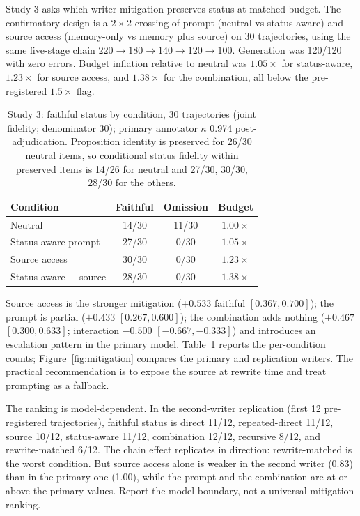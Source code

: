 \documentclass[11pt]{article}
\begin{document}
Study 3 asks which writer mitigation preserves status at matched budget. The
confirmatory design is a $2\times2$ crossing of prompt (neutral vs status-aware)
and source access (memory-only vs memory plus source) on 30 trajectories, using
the same five-stage chain $220 \to 180 \to 140 \to 120 \to 100$. Generation was
120/120 with zero errors. Budget inflation relative to neutral was $1.05\times$
for status-aware, $1.23\times$ for source access, and $1.38\times$ for the
combination, all below the pre-registered $1.5\times$ flag.

\begin{table}[t]
\centering
\small
\setlength{\tabcolsep}{3pt}
\begin{tabular}{lccc}
\toprule
Condition & Faithful & Omission & Budget \\
\midrule
Neutral & 14/30 & 11/30 & $1.00\times$ \\
Status-aware prompt & 27/30 & 0/30 & $1.05\times$ \\
Source access & 30/30 & 0/30 & $1.23\times$ \\
Status-aware + source & 28/30 & 0/30 & $1.38\times$ \\
\bottomrule
\end{tabular}
\caption{Study 3: faithful status by condition, 30 trajectories (joint fidelity;
denominator 30); primary annotator $\kappa$ 0.974 post-adjudication.
Proposition identity is preserved for 26/30 neutral items, so conditional
status fidelity within preserved items is 14/26 for neutral and 27/30, 30/30,
28/30 for the others.}
\label{tab:mitigation}
\end{table}

Source access is the stronger mitigation ($+0.533$ faithful $[0.367, 0.700]$);
the prompt is partial ($+0.433$ $[0.267, 0.600]$); the combination adds nothing
($+0.467$ $[0.300, 0.633]$; interaction $-0.500$ $[-0.667, -0.333]$) and
introduces an escalation pattern in the primary model. Table~\ref{tab:mitigation}
reports the per-condition counts; Figure~\ref{fig:mitigation} compares the
primary and replication writers. The practical recommendation is to expose the
source at rewrite time and treat prompting as a fallback.

The ranking is model-dependent. In the second-writer replication (first 12
pre-registered trajectories), faithful status is direct 11/12, repeated-direct
11/12, source 10/12, status-aware 11/12, combination 12/12, recursive 8/12, and
rewrite-matched 6/12. The chain effect replicates in direction: rewrite-matched
is the worst condition. But source access alone is weaker in the second writer
(0.83) than in the primary one (1.00), while the prompt and the combination are
at or above the primary values. Report the model boundary, not a universal
mitigation ranking.
\end{document}
